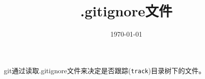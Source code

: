 
\title{.gitignore文件}

\date{\today}


\maketitle

git通过读取.gitignore文件来决定是否跟踪(\verb|track|)目录树下的文件。





